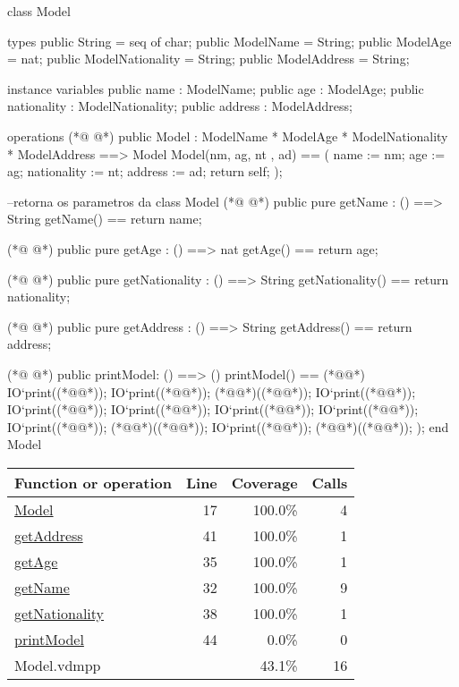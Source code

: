 \begin{vdmpp}[breaklines=true]
class Model

types
 public String = seq of char;
 public ModelName = String;
 public ModelAge = nat;
 public ModelNationality = String;
 public ModelAddress = String;
 
instance variables
 public name : ModelName;
 public age : ModelAge;
 public nationality : ModelNationality;
 public address : ModelAddress;
 
 operations
(*@
\label{Model:17}
@*)
  public Model : 
          ModelName * 
          ModelAge *
          ModelNationality * 
          ModelAddress ==> Model
  Model(nm, ag, nt , ad) ==
  (
    name := nm;
    age := ag;
    nationality := nt;
    address := ad;
    return self;
  );
  
  --retorna os parametros da class Model
(*@
\label{getName:32}
@*)
  public pure getName : () ==> String
    getName() == return name;
    
(*@
\label{getAge:35}
@*)
   public pure getAge : () ==> nat
     getAge() == return age;
     
(*@
\label{getNationality:38}
@*)
  public pure getNationality : () ==> String
     getNationality() == return nationality;
     
(*@
\label{getAddress:41}
@*)
  public pure getAddress : () ==> String
     getAddress() == return address;      
     
(*@
\label{printModel:44}
@*)
  public printModel: () ==> ()
  printModel() == (*@\vdmnotcovered{(}@*)
  IO`print((*@@*));
   IO`print((*@@*));
   (*@@*)((*@@*));
   IO`print((*@@*));
   IO`print((*@@*));
   IO`print((*@@*));
   IO`print((*@@*));
   IO`print((*@@*));
   IO`print((*@@*));
   (*@@*)((*@@*));
    IO`print((*@@*));
   (*@@*)((*@@*));
  );   
end Model
\end{vdmpp}
\bigskip
\begin{longtable}{|l|r|r|r|}
\hline
Function or operation & Line & Coverage & Calls \\
\hline
\hline
\hyperref[Model:17]{Model} & 17&100.0\% & 4 \\
\hline
\hyperref[getAddress:41]{getAddress} & 41&100.0\% & 1 \\
\hline
\hyperref[getAge:35]{getAge} & 35&100.0\% & 1 \\
\hline
\hyperref[getName:32]{getName} & 32&100.0\% & 9 \\
\hline
\hyperref[getNationality:38]{getNationality} & 38&100.0\% & 1 \\
\hline
\hyperref[printModel:44]{printModel} & 44&0.0\% & 0 \\
\hline
\hline
Model.vdmpp & & 43.1\% & 16 \\
\hline
\end{longtable}

